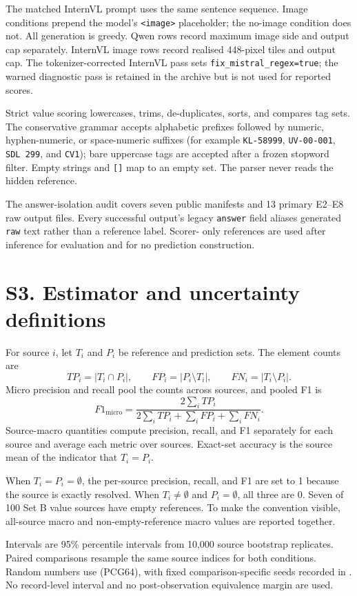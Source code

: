 \documentclass[11pt]{article}
\begin{document}
The matched InternVL prompt uses the same sentence sequence. Image conditions
prepend the model's \texttt{<image>} placeholder; the no-image condition does
not. All generation is greedy. Qwen rows record maximum image side and output
cap separately. InternVL image rows record realised 448-pixel tiles and output
cap. The tokenizer-corrected InternVL pass sets
\texttt{fix\_mistral\_regex=true}; the warned diagnostic pass is retained in
the archive but is not used for reported scores.

Strict value scoring lowercases, trims, de-duplicates, sorts, and compares tag
sets. The conservative grammar accepts alphabetic prefixes followed by
numeric, hyphen-numeric, or space-numeric suffixes (for example
\texttt{KL-58999}, \texttt{UV-00-001}, \texttt{SDL 299}, and
\texttt{CV1}); bare uppercase tags are accepted after a frozen stopword
filter. Empty strings and \texttt{[]} map to an empty set. The parser never
reads the hidden reference.

The answer-isolation audit covers seven public manifests and 13 primary E2--E8
raw output files. Every successful output's legacy \texttt{answer} field
aliases generated \texttt{raw} text rather than a reference label. Scorer-
only references are used after inference for evaluation and for no prediction
construction.

\section*{S3. Estimator and uncertainty definitions}

For source $i$, let $T_i$ and $P_i$ be reference and prediction sets. The
element counts are
\[
TP_i=|T_i\cap P_i|,\qquad FP_i=|P_i\setminus T_i|,\qquad
FN_i=|T_i\setminus P_i|.
\]
Micro precision and recall pool the counts across sources, and pooled F1 is
\[
F1_{\mathrm{micro}}=
\frac{2\sum_iTP_i}{2\sum_iTP_i+\sum_iFP_i+\sum_iFN_i}.
\]
Source-macro quantities compute precision, recall, and F1 separately for each
source and average each metric over sources. Exact-set accuracy is the source
mean of the indicator that $T_i=P_i$.

When $T_i=P_i=\emptyset$, the per-source precision, recall, and F1 are set to
1 because the source is exactly resolved. When $T_i\neq\emptyset$ and
$P_i=\emptyset$, all three are 0. Seven of 100 Set B value sources have empty
references. To make the convention visible, all-source macro and
non-empty-reference macro values are reported together.

Intervals are 95\% percentile intervals from 10,000 source bootstrap
replicates. Paired comparisons resample the same source indices for both
conditions. Random numbers use  (PCG64), with
fixed comparison-specific seeds recorded in
. No record-level interval and no
post-observation equivalence margin are used.
\end{document}
